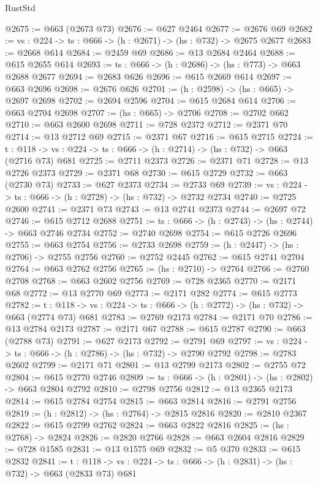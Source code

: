 \begin{lexlean}{RustStd}
\begin{coremodule}
@2675 := @663 (@2673 @73)
@2676 := @627 @2464
@2677 := @2676 @69
@2682 := {vs : @224} -> {ts : @666} -> (h : @2671) -> (hs : @732) -> @2675 @2677
@2683 := @2668 @614
@2684 := @2459 @69
@2686 := @13 @2684 @2464
@2688 := @615 @2655 @614
@2693 := {ts : @666} -> (h : @2686) -> (hs : @773) -> @663 @2688 @2677
@2694 := @2683 @626
@2696 := @615 @2669 @614
@2697 := @663 @2696
@2698 := @2676 @626
@2701 := (h : @2598) -> (hs : @665) -> @2697 @2698
@2702 := @2694 @2596
@2704 := @615 @2684 @614
@2706 := @663 @2704 @2698
@2707 := (hs : @665) -> @2706
@2708 := @2702 @662
@2710 := @663 @2600 @2698
@2711 := @728 @2372
@2712 := @2371 @70
@2714 := @13 @2712 @69
@2715 := @2371 @67
@2716 := @615 @2715
@2724 := {t : @118} ->
  {vs : @224} -> {ts : @666} -> (h : @2714) -> (hs : @732) -> @663 (@2716 @73) @681
@2725 := @2711 @2373
@2726 := @2371 @71
@2728 := @13 @2726 @2373
@2729 := @2371 @68
@2730 := @615 @2729
@2732 := @663 (@2730 @73)
@2733 := @627 @2373
@2734 := @2733 @69
@2739 := {vs : @224} -> {ts : @666} -> (h : @2728) -> (hs : @732) -> @2732 @2734
@2740 := @2725 @2600
@2741 := @2371 @73
@2743 := @13 @2741 @2373
@2744 := @2697 @72
@2746 := @615 @2712 @2688
@2751 := {ts : @666} -> (h : @2743) -> (hs : @2744) -> @663 @2746 @2734
@2752 := @2740 @2698
@2754 := @615 @2726 @2696
@2755 := @663 @2754
@2756 := @2733 @2698
@2759 := (h : @2447) -> (hs : @2706) -> @2755 @2756
@2760 := @2752 @2445
@2762 := @615 @2741 @2704
@2764 := @663 @2762 @2756
@2765 := (hs : @2710) -> @2764
@2766 := @2760 @2708
@2768 := @663 @2602 @2756
@2769 := @728 @2365
@2770 := @2171 @68
@2772 := @13 @2770 @69
@2773 := @2171 @282
@2774 := @615 @2773
@2782 := {t : @118} ->
  {vs : @224} -> {ts : @666} -> (h : @2772) -> (hs : @732) -> @663 (@2774 @73) @681
@2783 := @2769 @2173
@2784 := @2171 @70
@2786 := @13 @2784 @2173
@2787 := @2171 @67
@2788 := @615 @2787
@2790 := @663 (@2788 @73)
@2791 := @627 @2173
@2792 := @2791 @69
@2797 := {vs : @224} -> {ts : @666} -> (h : @2786) -> (hs : @732) -> @2790 @2792
@2798 := @2783 @2602
@2799 := @2171 @71
@2801 := @13 @2799 @2173
@2802 := @2755 @72
@2804 := @615 @2770 @2746
@2809 := {ts : @666} -> (h : @2801) -> (hs : @2802) -> @663 @2804 @2792
@2810 := @2798 @2756
@2812 := @13 @2365 @2173
@2814 := @615 @2784 @2754
@2815 := @663 @2814
@2816 := @2791 @2756
@2819 := (h : @2812) -> (hs : @2764) -> @2815 @2816
@2820 := @2810 @2367
@2822 := @615 @2799 @2762
@2824 := @663 @2822 @2816
@2825 := (hs : @2768) -> @2824
@2826 := @2820 @2766
@2828 := @663 @2604 @2816
@2829 := @728 @1585
@2831 := @13 @1575 @69
@2832 := @5 @370
@2833 := @615 @2832
@2841 := {t : @118} ->
  {vs : @224} -> {ts : @666} -> (h : @2831) -> (hs : @732) -> @663 (@2833 @73) @681

\end{coremodule}
\end{lexlean}

